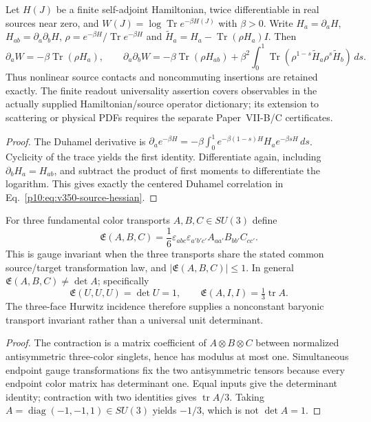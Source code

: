 \documentclass[12pt,a4paper]{article}
\begin{document}
\begin{theorem}
\label{p10:thm:v350-dynamical-source-hessian}
Let $H(J)$ be a finite self-adjoint Hamiltonian, twice
differentiable in real sources near zero, and
$W(J)=\log\operatorname{Tr}e^{-\beta H(J)}$ with $\beta>0$.
Write $H_a=\partial_aH$, $H_{ab}=\partial_a\partial_bH$,
$\rho=e^{-\beta H}/\operatorname{Tr}e^{-\beta H}$ and
$\widetilde H_a=H_a-\operatorname{Tr}(\rho H_a)I$. Then
\begin{equation}
\label{p10:eq:v350-source-hessian}
 \partial_aW=-\beta\operatorname{Tr}(\rho H_a),\qquad
 \partial_a\partial_bW=-\beta\operatorname{Tr}(\rho H_{ab})
   +\beta^2\int_0^1\operatorname{Tr}
       (\rho^{1-s}\widetilde H_a\rho^s\widetilde H_b)\,ds.
\end{equation}
Thus nonlinear source contacts and noncommuting insertions
are retained exactly. The finite readout universality assertion
covers observables in the actually supplied Hamiltonian/source
operator dictionary; its extension to scattering or physical
PDFs requires the separate Paper~VII-B/C certificates.
\end{theorem}
\begin{proof}
The Duhamel derivative is
$\partial_a e^{-\beta H}=-\beta\int_0^1
 e^{-\beta(1-s)H}H_a e^{-\beta sH}\,ds$.
Cyclicity of the trace yields the first identity. Differentiate
again, including $\partial_bH_a=H_{ab}$, and subtract the
product of first moments to differentiate the logarithm.
This gives exactly the centered Duhamel correlation in
Eq.~\eqref{p10:eq:v350-source-hessian}.
\end{proof}

\begin{proposition}
\label{p10:prop:v350-three-face-polarization}
For three fundamental color transports $A,B,C\in SU(3)$ define
\[
 \mathfrak E(A,B,C)=\frac16\varepsilon_{abc}\varepsilon_{a'b'c'}
 A_{aa'}B_{bb'}C_{cc'}.
\]
This is gauge invariant when the three transports share the stated
common source/target transformation law, and
$|\mathfrak E(A,B,C)|\le1$. In general
$\mathfrak E(A,B,C)\ne\det A$; specifically
\[
 \mathfrak E(U,U,U)=\det U=1,\qquad
 \mathfrak E(A,I,I)=\tfrac13\operatorname{tr}A.
\]
The three-face Hurwitz incidence therefore supplies a nonconstant
baryonic transport invariant rather than a universal unit determinant.
\end{proposition}
\begin{proof}
The contraction is a matrix coefficient of
$A\otimes B\otimes C$ between normalized antisymmetric
three-color singlets, hence has modulus at most one.
Simultaneous endpoint gauge transformations fix the two
antisymmetric tensors because every endpoint color matrix
has determinant one. Equal inputs give the determinant
identity; contraction with two identities gives
$\operatorname{tr}A/3$. Taking
$A=\operatorname{diag}(-1,-1,1)\in SU(3)$ yields $-1/3$,
which is not $\det A=1$.
\end{proof}
\end{document}

